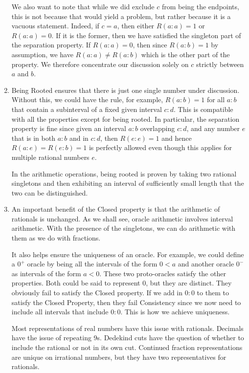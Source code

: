 \documentclass[12pt]{article}
\begin{document}
\begin{enumerate}
    We also want to note that while we did exclude $c$ from being the endpoints, this is not because that would yield a problem, but rather because it is a vacuous statement. Indeed, if $c=a$, then either $R(a:a)=1$ or $R(a:a)=0$. If it is the former, then we have satisfied the singleton part of the separation property. If $R(a:a)=0$, then since $R(a:b)=1$ by assumption, we have $R(a:a) \neq R(a:b)$ which is the other part of the property. We therefore concentrate our discussion solely on $c$ strictly between $a$ and $b$.
    
    \item Being Rooted ensures that there is just one single number under discussion. Without this, we could have the rule, for example, $R(a:b) = 1$ for all $a:b$ that contain a subinterval of a fixed given interval $c:d$. This is compatible with all the properties except for being rooted. In particular, the separation property is fine since given an interval $a:b$ overlapping  $c:d$, and any number $e$ that is in both $a:b$ and in $c:d$, then $R(e:e) = 1$ and hence $R(a:e)=R(e:b) = 1$ is perfectly allowed even though this applies for multiple rational numbers $e$.
    
    In the arithmetic operations, being rooted is proven by taking two rational singletons and then exhibiting an interval of sufficiently small length that the two can be distinguished. 

    \item An important benefit of the Closed property is that the arithmetic of rationals is unchanged. As we shall see, oracle arithmetic involves interval arithmetic. With the presence of the singletons, we can do arithmetic with them as we do with fractions. 
    
    It also helps ensure the uniqueness of an oracle. For example, we could define a $0^+$ oracle by being all the intervals of the form $0\lt a$ and another oracle $0^-$ as intervals of the form $a \lt 0$. These two proto-oracles satisfy the other properties. Both could be said to represent $0$, but they are distinct. They obviously fail to satisfy the Closed property. If we add in $0:0$ to them to satisfy the Closed Property, then they fail Consistency since we now need to include all intervals that include $0:0$. This is how we achieve uniqueness. 
    
    Most representations of real numbers have this issue with rationals. Decimals have the issue of repeating 9s. Dedekind cuts have the question of whether to include the rational or not in its own cut. Continued fraction representations are unique on irrational numbers, but they have two representatives for rationals. 
    

\end{enumerate}
\end{document}
